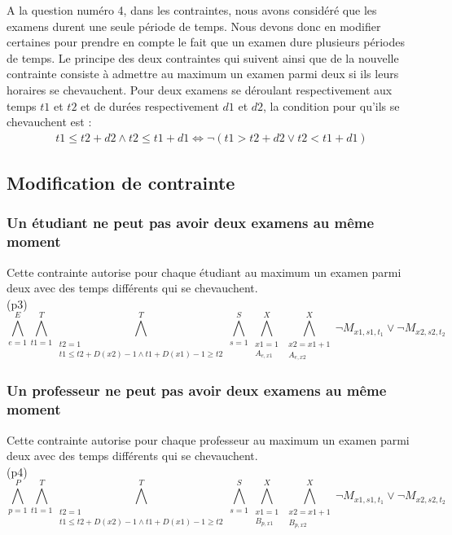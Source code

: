 \documentclass[a4paper,11pt]{article}
\begin{document}
A la question numéro 4, dans les contraintes, nous avons considéré que les examens durent une seule période de temps. Nous devons donc en modifier certaines pour prendre en compte le fait que un examen dure plusieurs périodes de temps. 
Le principe des deux contraintes qui suivent ainsi que de la nouvelle contrainte consiste à admettre au maximum un examen parmi deux si ils leurs horaires se chevauchent. Pour deux examens se déroulant respectivement aux temps $t1$ et $t2$ et de durées respectivement $d1$ et $d2$, la condition pour qu'ils se chevauchent est : 
\begin{align}
t1 \leq t2 + d2 \wedge t2 \leq t1 + d1
\iff \neg (t1 > t2 + d2 \vee t2 < t1 + d1)
\end{align}

\subsection{Modification de contrainte}

\subsubsection{Un étudiant ne peut pas avoir deux examens au même moment}
Cette contrainte autorise pour chaque étudiant au maximum un examen parmi deux avec des temps différents qui se chevauchent.\\
(p3)
\begin{displaymath}
\bigwedge\limits_{e=1}^{E}\bigwedge\limits_{t1=1}^{T}\bigwedge\limits_{\substack{t2=1 \\ t1 \leq t2 + D(x2)-1 \wedge t1 + D(x1)-1 \geq t2}}^{T}\bigwedge\limits_{s=1}^{S}\bigwedge\limits_{\substack{x1=1 \\ A_{e,x1}}}^{X}\bigwedge\limits_{\substack{x2=x1+1 \\ A_{e,x2}}}^{X} \neg M_{x1, s1, t_{1}} \vee \neg M_{x2, s2, t_{2}}
\end{displaymath}

\subsubsection{Un professeur ne peut pas avoir deux examens au même moment}
Cette contrainte autorise pour chaque professeur au maximum un examen parmi deux avec des temps différents qui se chevauchent.\\
(p4)
\begin{displaymath}
\bigwedge\limits_{p=1}^{P}\bigwedge\limits_{t1=1}^{T}\bigwedge\limits_{\substack{t2=1 \\ t1 \leq t2 + D(x2)-1 \wedge t1 + D(x1)-1 \geq t2}}^{T}\bigwedge\limits_{s=1}^{S}\bigwedge\limits_{\substack{x1=1 \\ B_{p,x1}}}^{X}\bigwedge\limits_{\substack{x2=x1+1 \\ B_{p,x2}}}^{X} \neg M_{x1, s1, t_{1}} \vee \neg M_{x2, s2, t_{2}}
\end{displaymath}
\end{document}
